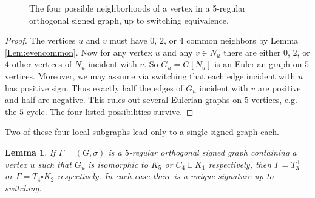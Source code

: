 \documentclass[11pt]{article}
\theoremstyle{plain}
\newtheorem{lemma}[theorem]{Lemma}
\theoremstyle{definition}
\begin{document}
\begin{figure}

    \caption{The four possible neighborhoods of a vertex in a 5-regular orthogonal signed graph, up to switching equivalence.}
    \label{Fig:5nbhds}
\end{figure}


\begin{proof}
The vertices $u$ and $v$ must have $0$, $2$, or $4$ common neighbors by Lemma \ref{Lem:evencommon}. Now for any vertex $u$ and any $v\in N_u$ there are either $0$, $2$, or $4$ other vertices of $N_u$ incident with $v$. So $G_u=G[N_u]$ is an Eulerian graph on $5$ vertices. Moreover, we may assume via switching that each edge incident with $u$ has positive sign. Thus exactly half the edges of $G_u$ incident with $v$ are positive and half are negative. This rules out several Eulerian graphs on $5$ vertices, e.g. the $5$-cycle. The four listed possibilities survive.
\end{proof}

Two of these four local subgraphs lead only to a single signed graph each.

\begin{lemma} \label{Lem:Locally_k5_c4}
If $\Gamma=(G,\sigma)$ is a $5$-regular orthogonal signed graph containing a vertex $u$ such that $G_u$ is isomorphic to $K_5$ or $C_4\sqcup K_1$ respectively, then $\Gamma=T_3^+$ or $\Gamma=T_4\square K_2$ respectively. In each case there is a unique signature up to switching.
\end{lemma}
\end{document}
